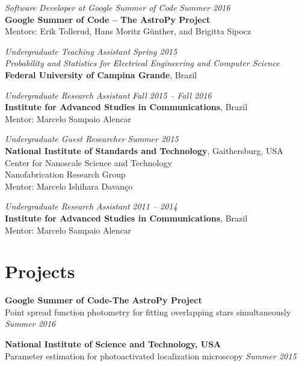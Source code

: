 \documentclass[10pt]{article}
\begin{document}
\begin{titlepage}
\emph{Software Developer at Google Summer of Code} \hfill \textit{Summer 2016}
\\\textbf{Google Summer of Code -- The AstroPy Project}
\\Mentors: Erik Tollerud, Hans Moritz G\"unther, and Brigitta Sipocz
\vspace{.5cm}

\emph{Undergraduate Teaching Assistant} \hfill \textit{Spring 2015}
\\\emph{Probability and Statistics for Electrical Engineering and Computer Science}
\\\textbf{Federal University of Campina Grande}, Brazil
\vspace{.5cm}

\emph{Undergraduate Research Assistant} \hfill \textit{Fall 2015 -- Fall 2016}
\\\textbf{Institute for Advanced Studies in Communications}, Brazil
\\Mentor: Marcelo Sampaio Alencar
\vspace{.5cm}

\emph{Undergraduate Guest Researcher} \hfill \textit{Summer 2015}
\\\textbf{National Institute of Standards and Technology}, Gaithersburg, USA
\\Center for Nanoscale Science and Technology
\\Nanofabrication Research Group
\\Mentor: Marcelo Ishihara Davan\c co
\vspace{.5cm}

\emph{Undergraduate Research Assistant} \hfill \textit{2011 -- 2014}
\\\textbf{Institute for Advanced Studies in Communications}, Brazil
\\Mentor: Marcelo Sampaio Alencar

\section*{Projects}

    \textbf{Google Summer of Code-The AstroPy Project}\\
    Point spread function photometry for fitting overlapping stars simultaneously
    \hfill \textit{Summer 2016}
    \vspace{.5cm}

    \textbf{National Institute of Science and Technology, USA}\\
    Parameter estimation for photoactivated localization microscopy
    \hfill \textit{Summer 2015}
    \vspace{.5cm}


\end{titlepage}
\end{document}

